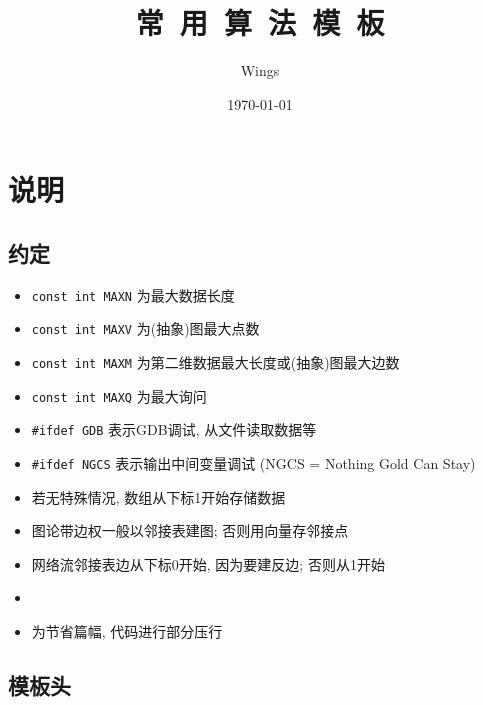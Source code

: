 \documentclass[utf8]{ctexart}
\newcommand{\cpp}[1]{\inputminted[linenos,breaklines,tabsize=4,mathescape]{c++}{#1}}
\begin{document}
\setcounter{section}{-1}	%
\title{\bf\Huge{常\ 用\ 算\ 法\ 模\ 板}}
\author{Wings}
\date{\today}

\begin{titlepage}
\newgeometry{}				%
\maketitle
\thispagestyle{empty}		%
\end{titlepage}
\newpage

\linespread{1} \selectfont 	%

\setcounter{page}{1}
\tableofcontents
\newpage

\setcounter{page}{1}

\section{说明}

\subsection{约定}

\begin{itemize}
\setlength{\itemsep}{-5pt}	%
\item \texttt{const int MAXN} 为最大数据长度
\item \texttt{const int MAXV} 为(抽象)图最大点数
\item \texttt{const int MAXM} 为第二维数据最大长度或(抽象)图最大边数
\item \texttt{const int MAXQ} 为最大询问
\item \texttt{#ifdef GDB} 表示GDB调试, 从文件读取数据等
\item \texttt{#ifdef NGCS} 表示输出中间变量调试 (NGCS = Nothing Gold Can Stay)
\item 若无特殊情况, 数组从下标1开始存储数据
\item 图论带边权一般以邻接表建图; 否则用向量存邻接点
\item 网络流邻接表边从下标0开始, 因为要建反边; 否则从1开始
\item[]
\item 为节省篇幅, 代码进行部分压行
\end{itemize}

\subsection{模板头}
\cpp{codes/head.cpp}
\end{document}
